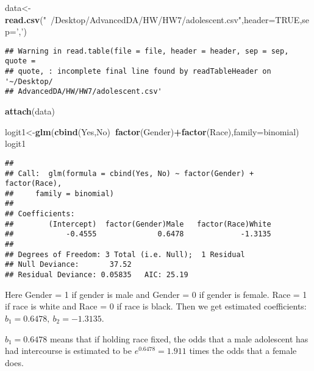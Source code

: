 \documentclass[]{article}
\newenvironment{Shaded}{\begin{snugshade}}{\end{snugshade}}
\newcommand{\DataTypeTok}[1]{\textcolor[rgb]{0.13,0.29,0.53}{#1}}
\newcommand{\KeywordTok}[1]{\textcolor[rgb]{0.13,0.29,0.53}{\textbf{#1}}}
\newcommand{\NormalTok}[1]{#1}
\newcommand{\OperatorTok}[1]{\textcolor[rgb]{0.81,0.36,0.00}{\textbf{#1}}}
\newcommand{\OtherTok}[1]{\textcolor[rgb]{0.56,0.35,0.01}{#1}}
\newcommand{\StringTok}[1]{\textcolor[rgb]{0.31,0.60,0.02}{#1}}
\begin{document}
\begin{Shaded}
\begin{Highlighting}[]
\NormalTok{data<-}\KeywordTok{read.csv}\NormalTok{(}\StringTok{"~/Desktop/AdvancedDA/HW/HW7/adolescent.csv"}\NormalTok{,}\DataTypeTok{header=}\OtherTok{TRUE}\NormalTok{,}\DataTypeTok{sep=}\StringTok{','}\NormalTok{)}
\end{Highlighting}
\end{Shaded}

\begin{verbatim}
## Warning in read.table(file = file, header = header, sep = sep, quote =
## quote, : incomplete final line found by readTableHeader on '~/Desktop/
## AdvancedDA/HW/HW7/adolescent.csv'
\end{verbatim}

\begin{Shaded}
\begin{Highlighting}[]
\KeywordTok{attach}\NormalTok{(data)}
\end{Highlighting}
\end{Shaded}

\begin{Shaded}
\begin{Highlighting}[]
\NormalTok{logit1<-}\KeywordTok{glm}\NormalTok{(}\KeywordTok{cbind}\NormalTok{(Yes,No)}\OperatorTok{~}\KeywordTok{factor}\NormalTok{(Gender)}\OperatorTok{+}\KeywordTok{factor}\NormalTok{(Race),}\DataTypeTok{family=}\NormalTok{binomial)}
\NormalTok{logit1}
\end{Highlighting}
\end{Shaded}

\begin{verbatim}
## 
## Call:  glm(formula = cbind(Yes, No) ~ factor(Gender) + factor(Race), 
##     family = binomial)
## 
## Coefficients:
##        (Intercept)  factor(Gender)Male   factor(Race)White  
##            -0.4555              0.6478             -1.3135  
## 
## Degrees of Freedom: 3 Total (i.e. Null);  1 Residual
## Null Deviance:       37.52 
## Residual Deviance: 0.05835   AIC: 25.19
\end{verbatim}

Here Gender = 1 if gender is male and Gender = 0 if gender is female.
Race = 1 if race is white and Race = 0 if race is black. Then we get
estimated coefficients: \(b_1 = 0.6478,\ b_2 = -1.3135\).

\(b_1 = 0.6478\) means that if holding race fixed, the odds that a male
adolescent has had intercourse is estimated to be \(e^{0.6478} = 1.911\)
times the odds that a female does.
\end{document}
